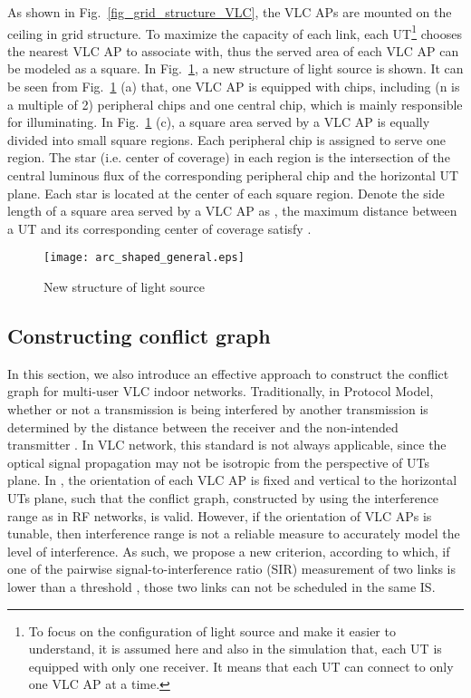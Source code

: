 \documentclass[10pt,journal]{IEEEtran}
\begin{document}
As shown in Fig.~\ref{fig_grid_structure_VLC}, the VLC APs are mounted on the ceiling in grid structure. To maximize the capacity of each link, each UT\footnote{To focus on the configuration of light source and make it easier to understand, it is assumed here and also in the simulation that, each UT is equipped with only one receiver. It means that each UT can connect to only one VLC AP at a time.} chooses the nearest VLC AP to associate with, thus the served area of each VLC AP can be modeled as a square. In Fig.~\ref{fig_acr_shaped_general}, a new structure of light source is shown. It can be seen from Fig.~\ref{fig_acr_shaped_general} (a) that, one VLC AP is equipped with  chips, including  (n is a multiple of 2) peripheral chips and one central chip, which is mainly responsible for illuminating.  In Fig.~\ref{fig_acr_shaped_general} (c), a square area served by a VLC AP is equally divided into  small square regions. Each peripheral chip is assigned to serve one region. The star (i.e. center of coverage) in each region is the intersection of the central luminous flux of the corresponding peripheral chip and the horizontal UT plane. Each star is located at the center of each square region. Denote the side length of a square area served by a VLC AP as , the maximum distance  between a UT and its corresponding center of coverage satisfy .

\begin{figure}
\centering
\texttt{[image: arc\_shaped\_general.eps]}
\caption{New structure of light source}
\vspace{-5pt}
\label{fig_acr_shaped_general}
\end{figure}





\subsection{Constructing conflict graph}
In this section, we also introduce an effective approach to construct the conflict graph for multi-user VLC indoor networks. Traditionally, in Protocol Model, whether or not a transmission is being interfered by another transmission is determined by the distance between the receiver and the non-intended transmitter \cite{gupta2000capacity,shi2013bridging,shi2007optimal}. In VLC network, this standard is not always applicable, since the optical signal propagation may not be isotropic from the perspective of UTs plane. In \cite {tao2015scheduling}, the orientation of each VLC AP is fixed and vertical to the horizontal UTs plane, such that the conflict graph, constructed by using the interference range \cite{gupta2000capacity} as in RF networks, is valid. However, if the orientation of VLC APs is tunable, then interference range is not a reliable measure to accurately model the level of interference. As such, we propose a new criterion, according to which, if one of the pairwise signal-to-interference ratio (SIR) measurement of two links is lower than a threshold , those two links can not be scheduled in the same IS.
\end{document}

